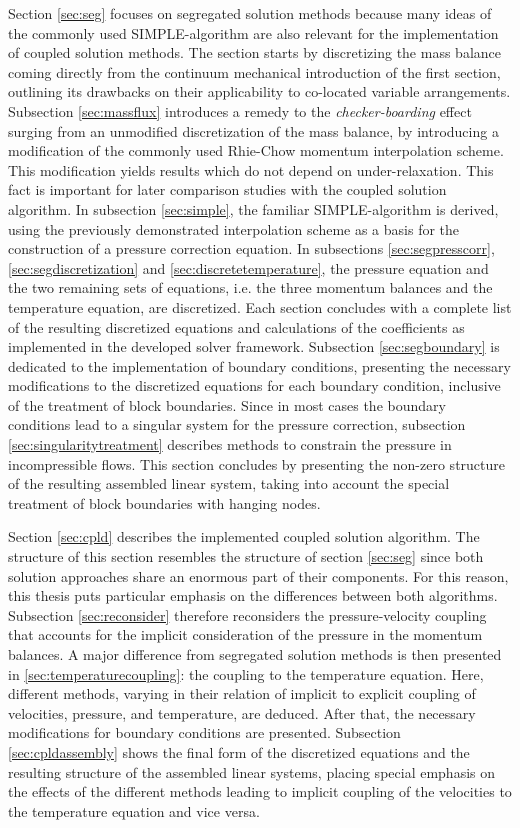 Section \ref{sec:seg} focuses on segregated solution methods because many ideas of the commonly used SIMPLE-algorithm are also relevant for the implementation of coupled solution methods. The section starts by discretizing the mass balance coming directly from the continuum mechanical introduction of the first section, outlining its drawbacks on their applicability to co-located variable arrangements. Subsection \ref{sec:massflux} introduces a remedy to the \emph{checker-boarding} effect surging from an unmodified discretization of the mass balance, by introducing a modification of the commonly used Rhie-Chow \cite{rhie82} momentum interpolation scheme. This modification yields results which do not depend on under-relaxation. This fact is important for later comparison studies with the coupled solution algorithm. In subsection \ref{sec:simple}, the familiar SIMPLE-algorithm is derived, using the previously demonstrated interpolation scheme as a basis for the construction of a pressure correction equation. In subsections \ref{sec:segpresscorr}, \ref{sec:segdiscretization} and \ref{sec:discretetemperature}, the pressure equation and the two remaining sets of equations, i.e. the three momentum balances and the temperature equation, are discretized. Each section concludes with a complete list of the resulting discretized equations and calculations of the coefficients as implemented in the developed solver framework. Subsection \ref{sec:segboundary} is dedicated to the implementation of boundary conditions, presenting the necessary modifications to the discretized equations for each boundary condition, inclusive of the treatment of block boundaries. Since in most cases the boundary conditions lead to a singular system for the pressure correction, subsection \ref{sec:singularitytreatment} describes methods to constrain the pressure in incompressible flows. This section concludes by presenting the non-zero structure of the resulting assembled linear system, taking into account the special treatment of block boundaries with hanging nodes.

Section \ref{sec:cpld} describes the implemented coupled solution algorithm. The structure of this section resembles the structure of section \ref{sec:seg} since both solution approaches share an enormous part of their components. For this reason, this thesis puts particular emphasis on the differences between both algorithms. Subsection \ref{sec:reconsider} therefore reconsiders the pressure-velocity coupling that accounts for the implicit consideration of the pressure in the momentum balances. A major difference from segregated solution methods is then presented in \ref{sec:temperaturecoupling}: the coupling to the temperature equation. Here, different methods, varying in their relation of implicit to explicit coupling of velocities, pressure, and temperature, are deduced. After that, the necessary modifications for boundary conditions are presented. Subsection \ref{sec:cpldassembly} shows the final form of the discretized equations and the resulting structure of the assembled linear systems, placing special emphasis on the effects of the different methods leading to implicit coupling of the velocities to the temperature equation and vice versa.

